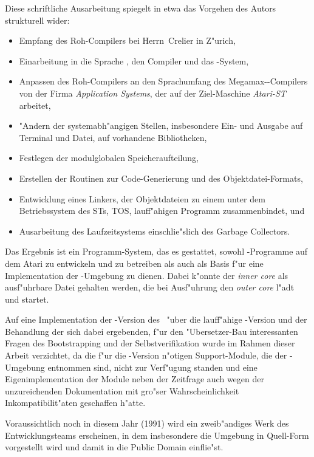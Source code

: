 Diese schriftliche Ausarbeitung spiegelt in etwa das Vorgehen des Autors
strukturell wider:
\begin{itemize}
\item Empfang des Roh-Compilers bei Herrn~Crelier in Z"urich,
\item Einarbeitung in die Sprache \oberon, den Compiler und das
  \oberon-System,
\item Anpassen des Roh-Compilers an den Sprachumfang des Megamax-\modula-Compilers
  von der Firma {\sl Application Systems}, der auf der Ziel-Maschine
  {\it Atari-ST\/} arbeitet,
\item "Andern der systemabh"angigen Stellen, insbesondere Ein- und Ausgabe
  auf Terminal und Datei, auf vorhandene Bibliotheken,
\item Festlegen der modulglobalen Speicheraufteilung,
\item Erstellen der Routinen zur Code-Generierung und des Objektdatei-Formats,
\item Entwicklung eines Linkers, der Objektdateien zu einem unter dem
  Betriebssystem des STs, TOS, lauff"ahigen Programm zusammenbindet, und
\item Ausarbeitung des Laufzeitsystems einschlie"slich des Garbage Collectors.
\end{itemize}

Das Ergebnis ist ein Programm-System, das es gestattet, sowohl
\oberon-Programme auf dem Atari zu entwickeln und zu betreiben als auch
als Basis f"ur eine Implementation der \oberon-Umgebung zu dienen.
Dabei k"onnte der {\it inner core\/} als ausf"uhrbare Datei gehalten werden,
die bei Ausf"uhrung den {\it outer core\/} l"adt und startet.

Auf eine Implementation der \oberon-Version des \OP\ "uber die lauff"ahige
\modula-Version und der Behandlung der sich dabei ergebenden, f"ur den
"Ubersetzer-Bau interessanten Fragen des Bootstrapping und der Selbstverifikation
wurde im Rahmen dieser Arbeit verzichtet, da die f"ur die \oberon-Version n"otigen
Support-Module, die der \oberon-Umgebung entnommen sind, nicht zur Verf"ugung
standen und eine Eigenimplementation der Module neben der Zeitfrage auch wegen
der unzureichenden Dokumentation mit gro"ser Wahrscheinlichkeit Inkompatibilit"aten
geschaffen h"atte.

Voraussichtlich noch in diesem Jahr (1991) wird ein zweib"andiges Werk des Entwicklungsteams
erscheinen, in dem insbesondere die Umgebung in Quell-Form vorgestellt wird
und damit in die Public Domain einflie"st.

